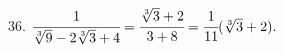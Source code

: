 36. $\cfrac{1}{\sqrt[3]{9}-2\sqrt[3]{3}+4}=\cfrac{\sqrt[3]{3}+2}{3+8}=\cfrac{1}{11}(\sqrt[3]{3}+2).$\\
